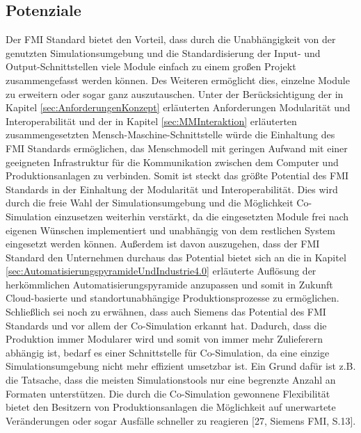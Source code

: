 \subsection{Potenziale}\label{sec:PotenzialeFMU}
Der FMI Standard bietet den Vorteil, dass durch die Unabhängigkeit von der genutzten Simulationsumgebung und die Standardisierung der Input- und Output-Schnittstellen viele Module einfach zu einem großen Projekt zusammengefasst werden können. Des Weiteren ermöglicht dies, einzelne Module zu erweitern oder sogar ganz auszutauschen.
\newline
Unter der Berücksichtigung der in Kapitel \ref{sec:AnforderungenKonzept} erläuterten Anforderungen Modularität und Interoperabilität und der in Kapitel \ref{sec:MMInteraktion} erläuterten zusammengesetzten Mensch-Maschine-Schnittstelle würde die Einhaltung des FMI Standards ermöglichen, das Menschmodell mit geringen Aufwand mit einer geeigneten Infrastruktur für die Kommunikation zwischen dem Computer und Produktionsanlagen zu verbinden.
\newline
Somit ist steckt das größte Potential des FMI Standards in der Einhaltung der Modularität und Interoperabilität. Dies wird durch die freie Wahl der Simulationsumgebung und die Möglichkeit Co-Simulation einzusetzen weiterhin verstärkt, da die eingesetzten Module frei nach eigenen Wünschen implementiert und unabhängig von dem restlichen System eingesetzt werden können. Außerdem ist davon auszugehen, dass der FMI Standard den Unternehmen durchaus das Potential bietet sich an die in Kapitel \ref{sec:AutomatisierungspyramideUndIndustrie4.0} erläuterte Auflösung der herkömmlichen Automatisierungspyramide anzupassen und somit in Zukunft Cloud-basierte und standortunabhängige Produktionsprozesse zu ermöglichen.
\newline
Schließlich sei noch zu erwähnen, dass auch Siemens das Potential des FMI Standards und vor allem der Co-Simulation erkannt hat. Dadurch, dass die Produktion immer Modularer wird und somit von immer mehr Zulieferern abhängig ist, bedarf es einer Schnittstelle für Co-Simulation, da eine einzige Simulationsumgebung nicht mehr effizient umsetzbar ist. Ein Grund dafür ist z.B. die Tatsache, dass die meisten Simulationstools nur eine begrenzte Anzahl an Formaten unterstützen. Die durch die Co-Simulation gewonnene Flexibilität bietet den Besitzern von Produktionsanlagen die Möglichkeit auf unerwartete Veränderungen oder sogar Ausfälle schneller zu reagieren [27, Siemens FMI, S.13]. 

